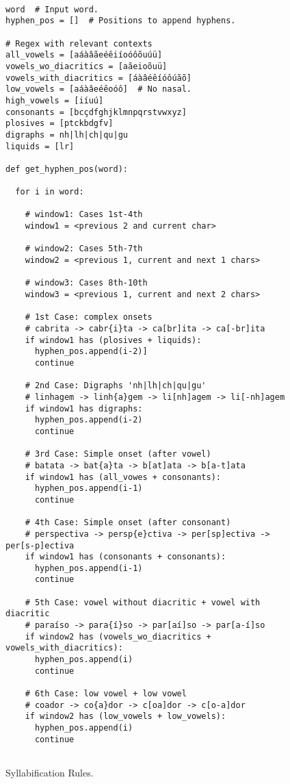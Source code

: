\begin{figure}[!ht]
  \caption{Syllabification Rules.}
      \label{pseudocode-syll-rules}
\footnotesize

\begin{verbatim}

word  # Input word.
hyphen_pos = []  # Positions to append hyphens.

# Regex with relevant contexts
all_vowels = [aáàâãeéêiíoóôõuúü]
vowels_wo_diacritics = [aãeioõuü]
vowels_with_diacritics = [áàâéêíóôúãõ]
low_vowels = [aáàâeéêoóô]  # No nasal.
high_vowels = [iíuú]
consonants = [bcçdfghjklmnpqrstvwxyz]
plosives = [ptckbdgfv]
digraphs = nh|lh|ch|qu|gu
liquids = [lr]

def get_hyphen_pos(word):

  for i in word:
  
    # window1: Cases 1st-4th
    window1 = <previous 2 and current char>
    
    # window2: Cases 5th-7th
    window2 = <previous 1, current and next 1 chars>
    
    # window3: Cases 8th-10th
    window3 = <previous 1, current and next 2 chars>
    
    # 1st Case: complex onsets
    # cabrita -> cabr{i}ta -> ca[br]ita -> ca[-br]ita 
    if window1 has (plosives + liquids):
      hyphen_pos.append(i-2)]
      continue
    
    # 2nd Case: Digraphs 'nh|lh|ch|qu|gu'
    # linhagem -> linh{a}gem -> li[nh]agem -> li[-nh]agem  
    if window1 has digraphs:
      hyphen_pos.append(i-2)
      continue
      
    # 3rd Case: Simple onset (after vowel)
    # batata -> bat{a}ta -> b[at]ata -> b[a-t]ata
    if window1 has (all_vowes + consonants):
      hyphen_pos.append(i-1)
      continue
    
    # 4th Case: Simple onset (after consonant)
    # perspectiva -> persp{e}ctiva -> per[sp]ectiva -> per[s-p]ectiva
    if window1 has (consonants + consonants):
      hyphen_pos.append(i-1)
      continue
    
    # 5th Case: vowel without diacritic + vowel with diacritic
    # paraíso -> para{í}so -> par[aí]so -> par[a-í]so
    if window2 has (vowels_wo_diacritics + vowels_with_diacritics):
      hyphen_pos.append(i)
      continue
    
    # 6th Case: low vowel + low vowel
    # coador -> co{a}dor -> c[oa]dor -> c[o-a]dor
    if window2 has (low_vowels + low_vowels):
      hyphen_pos.append(i)
      continue
    

\end{verbatim}
\end{figure}
